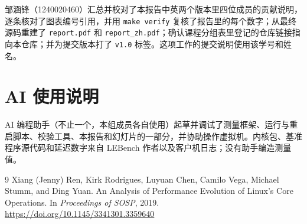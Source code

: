 \documentclass[11pt,fontset=none]{ctexart}
\begin{document}
邹涵锋（1240020460）汇总并校对了本报告中英两个版本里四位成员的贡献说明，逐条核对了图表编号引用，并用 \texttt{make verify} 复核了报告里的每个数字；从最终源码重建了 \texttt{report.pdf} 和 \texttt{report\_zh.pdf}；确认课程分组表里登记的仓库链接指向本仓库；并为提交版本打了 \texttt{v1.0} 标签。这项工作的提交说明使用该学号和姓名。

\section*{AI 使用说明}

AI 编程助手（不止一个，本组成员各自使用）起草并调试了测量框架、运行与重启脚本、校验工具、本报告和幻灯片的一部分，并协助操作虚拟机。内核包、基准程序源代码和延迟数字来自 LEBench 作者以及客户机日志；没有助手编造测量值。

\begin{thebibliography}{9}
Xiang (Jenny) Ren, Kirk Rodrigues, Luyuan Chen, Camilo Vega, Michael Stumm, and Ding Yuan.
An Analysis of Performance Evolution of Linux's Core Operations.
In \emph{Proceedings of SOSP}, 2019.
\url{https://doi.org/10.1145/3341301.3359640}
\end{thebibliography}
\end{document}
